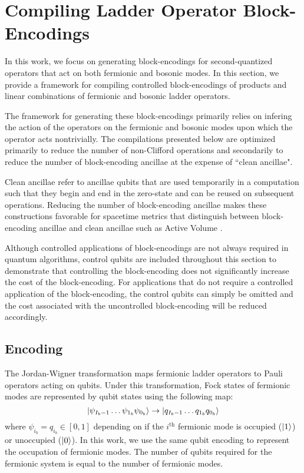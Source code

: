 \section{Compiling Ladder Operator Block-Encodings}
\label{sec:ladder-op-oracles}

In this work, we focus on generating block-encodings for second-quantized operators that act on both fermionic and bosonic modes.
In this section, we provide a framework for compiling controlled block-encodings of products and linear combinations of fermionic and bosonic ladder operators.

The framework for generating these block-encodings primarily relies on infering the action of the operators on the fermionic and bosonic modes upon which the operator acts nontrivially. 
The compilations presented below are optimized primarily to reduce the number of non-Clifford operations and secondarily to reduce the number of block-encoding ancillae at the expense of ``clean ancillae".

Clean ancillae refer to ancillae qubits that are used temporarily in a computation such that they begin and end in the zero-state and can be reused on subsequent operations.
Reducing the number of block-encoding ancillae makes these constructions favorable for spacetime metrics that distinguish between block-encoding ancillae and clean ancillae such as Active Volume \cite{litinski2022active}.

Although controlled applications of block-encodings are not always required in quantum algorithms, control qubits are included throughout this section to demonstrate that controlling the block-encoding does not significantly increase the cost of the block-encoding.
For applications that do not require a controlled application of the block-encoding, the control qubits can simply be omitted and the cost associated with the uncontrolled block-encoding will be reduced accordingly.

\subsection{Encoding}
\label{subsec:encoding}

The Jordan-Wigner transformation \cite{jordan-wigner} maps fermionic ladder operators to Pauli operators acting on qubits.
Under this transformation, Fock states of fermionic modes are represented by qubit states using the following map:
\begin{equation}
    \ket{\psi_{{I_b - 1}} \dots \psi_{1_b} \psi_{0_b}} \rightarrow \ket{q_{{I_b - 1}} \dots q_{1_b} q_{0_b}}
\end{equation}
where $\psi_{i_b} = q_{i_b} \in [0, 1]$ depending on if the $i^\text{th}$ fermionic mode is occupied ($\ket{1}$) or unoccupied ($\ket{0}$).
In this work, we use the same qubit encoding to represent the occupation of fermionic modes.
The number of qubits required for the fermionic system is equal to the number of fermionic modes.

